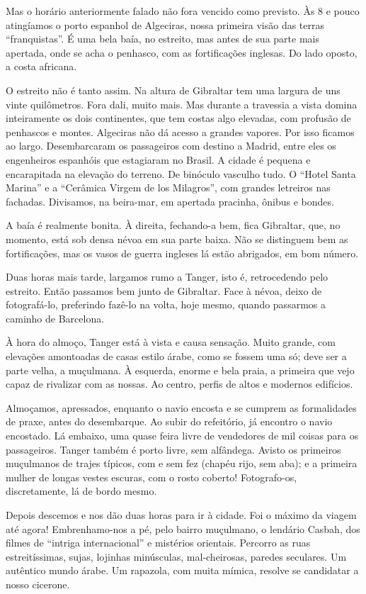 Mas o horário anteriormente falado não fora vencido como previsto. Às 8 e pouco atingíamos o porto espanhol de Algeciras, nossa primeira visão das terras ``franquistas''. É uma bela baía, no estreito, mas antes de sua parte mais apertada, onde se acha o penhasco, com as fortificações inglesas. Do lado oposto, a costa africana.

O estreito não é tanto assim. Na altura de Gibraltar tem uma largura de uns vinte quilômetros. Fora dali, muito mais. Mas durante a travessia a vista domina inteiramente os dois continentes, que tem costas algo elevadas, com profusão de penhascos e montes. Algeciras não dá acesso a grandes vapores. Por isso ficamos ao largo. Desembarcaram os passageiros com destino a Madrid, entre eles os engenheiros espanhóis que estagiaram no Brasil. A cidade é pequena e encarapitada na elevação do terreno. De binóculo vasculho tudo. O ``Hotel Santa Marina'' e a ``Cerâmica Virgem de los Milagros'', com grandes letreiros nas fachadas. Divisamos, na beira-mar, em apertada pracinha, ônibus e bondes.

A baía é realmente bonita. À direita, fechando-a bem, fica Gibraltar, que, no momento, está sob densa névoa em sua parte baixa. Não se distinguem bem as fortificações, mas os vasos de guerra ingleses lá estão abrigados, em bom número.

Duas horas mais tarde, largamos rumo a Tanger, isto é, retrocedendo pelo estreito. Então passamos bem junto de Gibraltar. Face à névoa, deixo de fotografá-lo, preferindo fazê-lo na volta, hoje mesmo, quando passarmos a caminho de Barcelona.

À hora do almoço, Tanger está à vista e causa sensação. Muito grande, com elevações amontoadas de casas estilo árabe, como se fossem uma só; deve ser a parte velha, a muçulmana. À esquerda, enorme e bela praia, a primeira que vejo capaz de rivalizar com as nossas. Ao centro, perfis de altos e modernos edifícios.

Almoçamos, apressados, enquanto o navio encosta e se cumprem as formalidades de praxe, antes do desembarque. Ao subir do refeitório, já encontro o navio encostado. Lá embaixo, uma quase feira livre de vendedores de mil coisas para os passageiros. Tanger também é porto livre, sem alfândega. Avisto os primeiros muçulmanos de trajes típicos, com e sem fez (chapéu rijo, sem aba); e a primeira mulher de longas vestes escuras, com o rosto coberto! Fotografo-os, discretamente, lá de bordo mesmo.

Depois descemos e nos dão duas horas para ir à cidade. Foi o máximo da viagem até agora! Embrenhamo-nos a pé, pelo bairro muçulmano, o lendário Casbah, dos filmes de ``intriga internacional'' e mistérios orientais. Percorro as ruas estreitíssimas, sujas, lojinhas minúsculas, mal-cheirosas, paredes seculares. Um autêntico mundo árabe. Um rapazola, com muita mímica, resolve se candidatar a nosso cicerone.

